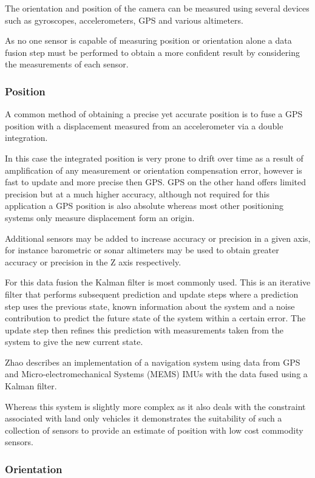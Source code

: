 \documentclass{entcs}
\begin{document}
The orientation and position of the camera can be measured using several
devices such as gyroscopes, accelerometers, GPS and various altimeters.

As no one sensor is capable of measuring position or orientation alone a data
fusion step must be performed to obtain a more confident result by considering
the measurements of each sensor.

\subsubsection{Position}

A common method of obtaining a precise yet accurate position is to fuse a GPS
position with a displacement measured from an accelerometer via a double
integration.

In this case the integrated position is very prone to drift over time as a
result of amplification of any measurement or orientation compensation error,
however is fast to update and more precise then GPS. GPS on the other hand
offers limited precision but at a much higher accuracy, although not required
for this application a GPS position is also absolute whereas most other
positioning systems only measure displacement form an origin.

Additional sensors may be added to increase accuracy or precision in a given
axis, for instance barometric or sonar altimeters may be used to obtain greater
accuracy or precision in the Z axis respectively.

For this data fusion the Kalman filter \cite{Kalman1960} is most commonly used.
This is an iterative filter that performs subsequent prediction and update steps
where a prediction step uses the previous state, known information about the
system and a noise contribution to predict the future state of the system within
a certain error. The update step then refines this prediction with measurements
taken from the system to give the new current state.

Zhao \cite{Zhao2011} describes an implementation of a navigation system using
data from GPS and Micro-electromechanical Systems (MEMS) IMUs with the data
fused using a Kalman filter.

Whereas this system is slightly more complex as it also deals with the
constraint associated with land only vehicles it demonstrates the suitability of
such a collection of sensors to provide an estimate of position with low cost
commodity sensors.

\subsubsection{Orientation}
\end{document}
